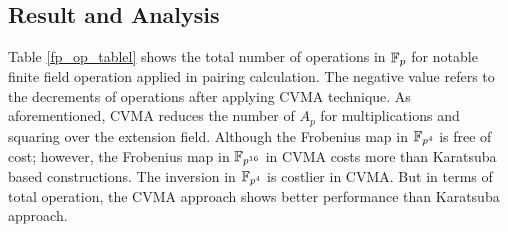 \subsection{Result and Analysis}
Table \ref{fp_op_tablel} shows the total number of operations in ${\mathbb{F}}_{p}$ for notable finite field operation applied in pairing calculation. 
The negative value refers to the decrements of operations after applying CVMA technique.
As aforementioned, CVMA reduces the number of $A_p$ for multiplications and squaring over the extension field.
Although the Frobenius map in $\mathbb{F}_{p^4}$ is free of cost; however, the Frobenius map in $\mathbb{F}_{p^{16}}$ in CVMA costs more than  Karatsuba based constructions.
The inversion in $\mathbb{F}_{p^4}$ is costlier in CVMA. 
But in terms of total operation, the CVMA approach shows better performance than Karatsuba approach.
